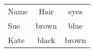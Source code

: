 \begin{tabular}{lcc}
Name & Hair & eyes \\
Sue &  brown & blue \\
Kate & black & brown
\end{tabular}

